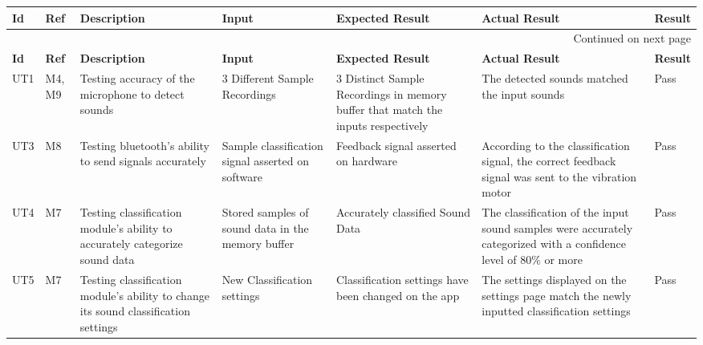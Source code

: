 \documentclass[12pt, titlepage]{article}
\begin{document}
\begin{longtable}{|p{1.4cm}|p{1.1cm}|p{2.5cm}|p{1.5cm}|p{2.2cm}|p{1.9cm}|p{1.2cm}|}

  \endfirsthead
  \hline
  \textbf{Id} & \textbf{Ref} & \textbf{Description}                                                         & \textbf{Input}                                    & \textbf{Expected Result}                                    & \textbf{Actual Result} & \textbf{Result}                                    \\ \hline

  \endhead

  \hline \multicolumn{7}{|r|}{Continued on next page} \\ \hline
  \endfoot
   
  \endlastfoot
  \hline
  \textbf{Id} & \textbf{Ref} & \textbf{Description}                                                         & \textbf{Input}                                    & \textbf{Expected Result}                                    & \textbf{Actual Result} & \textbf{Result}                                    \\ \hline
  UT1       &   M4, M9   & Testing accuracy of the microphone to detect sounds                                      & 3 Different Sample Recordings                             & 3 Distinct Sample Recordings in memory buffer that match the inputs respectively                    &     The detected sounds matched the input sounds                    & {\color[HTML]{32CB00} Pass} \\ \hline
  UT3       &   M8   & Testing bluetooth's ability to send signals accurately                                                  & Sample classification signal asserted on software                 & Feedback signal asserted on hardware                        &         According to the classification signal, the correct feedback signal was sent to the vibration motor               & {\color[HTML]{32CB00} Pass} \\ \hline
  UT4       &   M7   & Testing classification module's ability to accurately categorize sound data  & Stored samples of sound data in the memory buffer              & Accurately classified Sound Data                          &         The classification of the input sound samples were accurately categorized with a confidence level of 80\% or more               &                   {\color[HTML]{32CB00} Pass}                                 \\ \hline
  UT5       &   M7   & Testing classification module's ability to change its sound classification settings                                      & New Classification settings                                  & Classification settings have been changed on the app                    &       The settings displayed on the settings page match the newly inputted classification settings                 &       {\color[HTML]{32CB00} Pass}                                             \\ \hline

\end{longtable}
\end{document}
